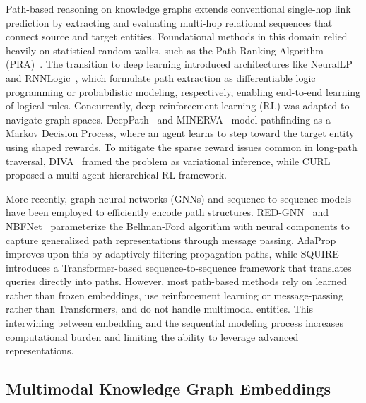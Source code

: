 \documentclass[runningheads]{llncs}
\begin{document}
Path-based reasoning on knowledge graphs extends conventional single-hop link prediction by extracting and evaluating multi-hop relational sequences that connect source and target entities. Foundational methods in this domain relied heavily on statistical random walks, such as the Path Ranking Algorithm (PRA)~\cite{lao2011random}. The transition to deep learning introduced architectures like NeuralLP~\cite{yang2017differentiable} and RNNLogic~\cite{qu2021rnnlogic}, which formulate path extraction as differentiable logic programming or probabilistic modeling, respectively, enabling end-to-end learning of logical rules. Concurrently, deep reinforcement learning (RL) was adapted to navigate graph spaces. DeepPath~\cite{xiong2017deeppath} and MINERVA~\cite{das2018go} model pathfinding as a Markov Decision Process, where an agent learns to step toward the target entity using shaped rewards. To mitigate the sparse reward issues common in long-path traversal, DIVA~\cite{chen2018variational} framed the problem as variational inference, while CURL~\cite{zhang2022learning} proposed a multi-agent hierarchical RL framework.

More recently, graph neural networks (GNNs) and sequence-to-sequence models have been employed to efficiently encode path structures. RED-GNN~\cite{zhang2022knowledge} and NBFNet~\cite{zhu2021neural} parameterize the Bellman-Ford algorithm with neural components to capture generalized path representations through message passing. AdaProp~\cite{zhang2023adaprop} improves upon this by adaptively filtering propagation paths, while SQUIRE~\cite{bai2022squire} introduces a Transformer-based sequence-to-sequence framework that translates queries directly into paths. However, most path-based methods rely on learned rather than frozen embeddings, use reinforcement learning or message-passing rather than Transformers, and do not handle multimodal entities. This interwining between embedding and the sequential modeling process increases computational burden and limiting the ability to leverage advanced representations.

\subsection{Multimodal Knowledge Graph Embeddings}
\label{sec:rw-mmkge}
\end{document}
